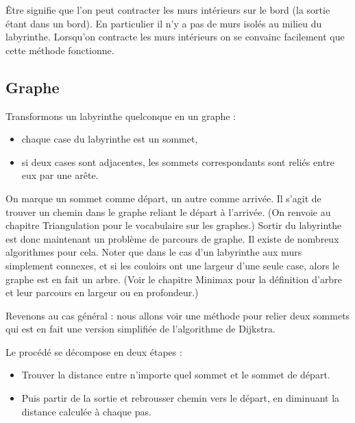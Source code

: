 \documentclass[11pt,class=report,crop=false]{standalone}
\begin{document}
Être  signifie que l'on peut contracter les murs intérieurs sur le bord (la sortie étant dans un bord). En particulier il n'y a pas de murs isolés au milieu du labyrinthe.
Lorsqu'on contracte les murs intérieurs on se convainc facilement que cette méthode fonctionne.





\subsection{Graphe}


Transformons un labyrinthe quelconque en un graphe :
\begin{itemize}
	\item chaque case du labyrinthe est un sommet,
	\item si deux cases sont adjacentes, les sommets correspondants sont reliés entre eux par une arête.
\end{itemize}



On marque un sommet comme départ, un autre comme arrivée. Il s'agit de trouver un chemin dans le graphe reliant le départ à l'arrivée.
(On renvoie au chapitre \og{}Triangulation\fg{} pour le vocabulaire sur les graphes.) 
Sortir du labyrinthe est donc maintenant un problème de parcours de graphe.
Il existe de nombreux algorithmes pour cela.
Noter que dans le cas d'un labyrinthe aux murs simplement connexes, et si les couloirs ont une largeur d'une seule case, alors le graphe est en fait un arbre.
(Voir le chapitre \og{}Minimax\fg{} pour la définition d'arbre et leur parcours en largeur ou en profondeur.)

Revenons au cas général : nous allons voir une méthode pour relier deux sommets qui est en fait une version simplifiée de l'algorithme de Dijkstra.

Le procédé se décompose en deux étapes :
\begin{itemize}
	\item Trouver la distance entre n'importe quel sommet et le sommet de départ.
	\item Puis partir de la sortie et rebrousser chemin vers le départ, en diminuant la distance calculée à chaque pas.
\end{itemize}
\end{document}
